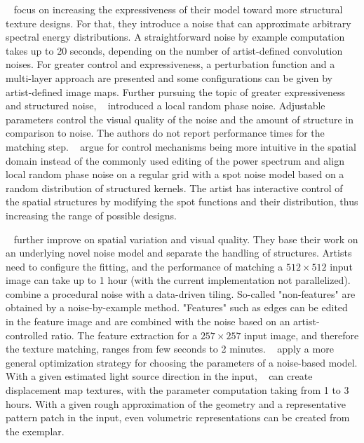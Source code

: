 {\citeauthor*{gilet_2012_mkn}~\cite{gilet_2012_mkn} focus on increasing the expressiveness of their model toward more structural texture designs. For that, they introduce a noise that can approximate arbitrary spectral energy distributions. A straightforward noise by example computation takes up to 20 seconds, depending on the number of artist-defined convolution noises. For greater control and expressiveness, a perturbation function and a multi-layer approach are presented and some configurations can be given by artist-defined image maps. Further pursuing the topic of greater expressiveness and structured noise, \citeauthor*{gilet_2014_lrn}~\cite{gilet_2014_lrn} introduced a local random phase noise. Adjustable parameters control the visual quality of the noise and the amount of structure in comparison to noise. The authors do not report performance times for the matching step. \citeauthor*{pavie_2016_pts}~\cite{pavie_2016_pts} argue for control mechanisms being more intuitive in the spatial domain instead of the commonly used editing of the power spectrum and align local random phase noise on a regular grid with a spot noise model based on a random distribution of structured kernels. The artist has interactive control of the spatial structures by modifying the spot functions and their distribution, thus increasing the range of possible designs.

\citeauthor*{guingo_2017_btm}~\cite{guingo_2017_btm} further improve on spatial variation and visual quality. They base their work on an underlying novel noise model and separate the handling of structures. Artists need to configure the fitting, and the performance of matching a $512\times512$ input image can take up to 1 hour (with the current implementation not parallelized). \citeauthor*{kang_2017_fpt}~\cite{kang_2017_fpt} combine a procedural noise with a data-driven tiling. So-called "non-features" are obtained by a noise-by-example method. "Features" such as edges can be edited in the feature image and are combined with the noise based on an artist-controlled ratio. The feature extraction for a $257\times257$ input image, and therefore the texture matching, ranges from few seconds to 2 minutes. \citeauthor*{gilet_2010_ias}~\cite{gilet_2010_ias} apply a more general optimization strategy for choosing the parameters of a noise-based model. With a given estimated light source direction in the input, \citeauthor*{gilet_2010_ias}~\cite{gilet_2010_ias} can create displacement map textures, with the parameter computation taking from 1 to 3 hours. With a given rough approximation of the geometry and a representative pattern patch in the input, even volumetric representations can be created from the exemplar.}


